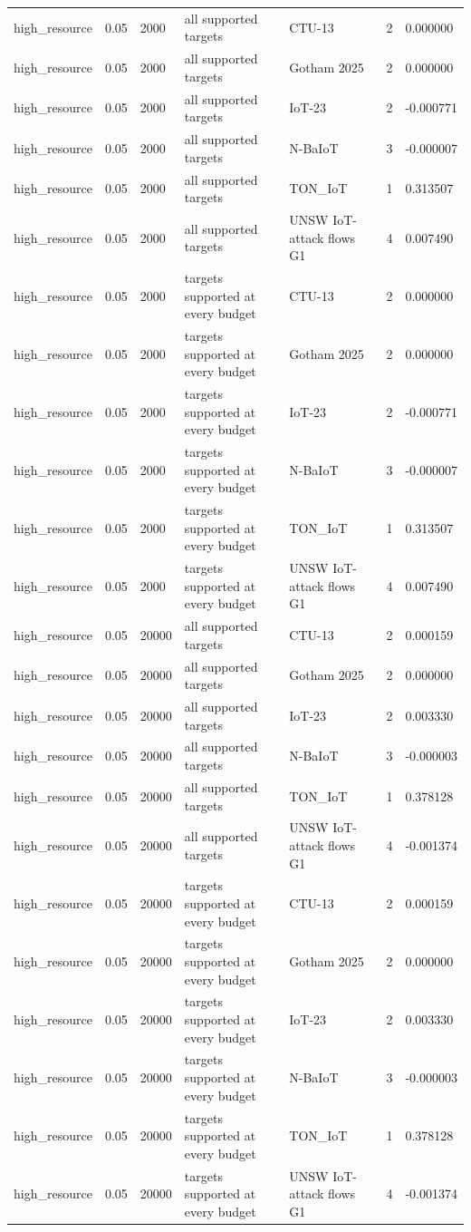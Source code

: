 \begin{tabular}{lllllll}
high\_resource & 0.05 & 2000 & all supported targets & CTU-13 & 2 & 0.000000 \\
high\_resource & 0.05 & 2000 & all supported targets & Gotham 2025 & 2 & 0.000000 \\
high\_resource & 0.05 & 2000 & all supported targets & IoT-23 & 2 & -0.000771 \\
high\_resource & 0.05 & 2000 & all supported targets & N-BaIoT & 3 & -0.000007 \\
high\_resource & 0.05 & 2000 & all supported targets & TON\_IoT & 1 & 0.313507 \\
high\_resource & 0.05 & 2000 & all supported targets & UNSW IoT-attack flows G1 & 4 & 0.007490 \\
high\_resource & 0.05 & 2000 & targets supported at every budget & CTU-13 & 2 & 0.000000 \\
high\_resource & 0.05 & 2000 & targets supported at every budget & Gotham 2025 & 2 & 0.000000 \\
high\_resource & 0.05 & 2000 & targets supported at every budget & IoT-23 & 2 & -0.000771 \\
high\_resource & 0.05 & 2000 & targets supported at every budget & N-BaIoT & 3 & -0.000007 \\
high\_resource & 0.05 & 2000 & targets supported at every budget & TON\_IoT & 1 & 0.313507 \\
high\_resource & 0.05 & 2000 & targets supported at every budget & UNSW IoT-attack flows G1 & 4 & 0.007490 \\
high\_resource & 0.05 & 20000 & all supported targets & CTU-13 & 2 & 0.000159 \\
high\_resource & 0.05 & 20000 & all supported targets & Gotham 2025 & 2 & 0.000000 \\
high\_resource & 0.05 & 20000 & all supported targets & IoT-23 & 2 & 0.003330 \\
high\_resource & 0.05 & 20000 & all supported targets & N-BaIoT & 3 & -0.000003 \\
high\_resource & 0.05 & 20000 & all supported targets & TON\_IoT & 1 & 0.378128 \\
high\_resource & 0.05 & 20000 & all supported targets & UNSW IoT-attack flows G1 & 4 & -0.001374 \\
high\_resource & 0.05 & 20000 & targets supported at every budget & CTU-13 & 2 & 0.000159 \\
high\_resource & 0.05 & 20000 & targets supported at every budget & Gotham 2025 & 2 & 0.000000 \\
high\_resource & 0.05 & 20000 & targets supported at every budget & IoT-23 & 2 & 0.003330 \\
high\_resource & 0.05 & 20000 & targets supported at every budget & N-BaIoT & 3 & -0.000003 \\
high\_resource & 0.05 & 20000 & targets supported at every budget & TON\_IoT & 1 & 0.378128 \\
high\_resource & 0.05 & 20000 & targets supported at every budget & UNSW IoT-attack flows G1 & 4 & -0.001374 \\
\bottomrule
\end{tabular}
